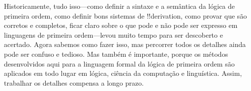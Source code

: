 \documentclass[../../../include/open-logic-section]{subfiles}
\begin{document}
Historicamente, tudo isso---como definir a sintaxe e a semântica da
lógica de primeira ordem, como definir bons sistemas de
!!{derivation}, como provar que são corretos e completos, ficar claro
sobre o que pode e não pode ser expresso em linguagens de primeira
ordem---levou muito tempo para ser descoberto e acertado.  Agora
sabemos como fazer isso, mas percorrer todos os detalhes ainda pode ser
confuso e tedioso.  Mas também é importante, porque os métodos
desenvolvidos aqui para a linguagem formal da lógica de primeira ordem
são aplicados em todo lugar em lógica, ciência da computação e
linguística. Assim, trabalhar os detalhes compensa a longo prazo.
\end{document}

